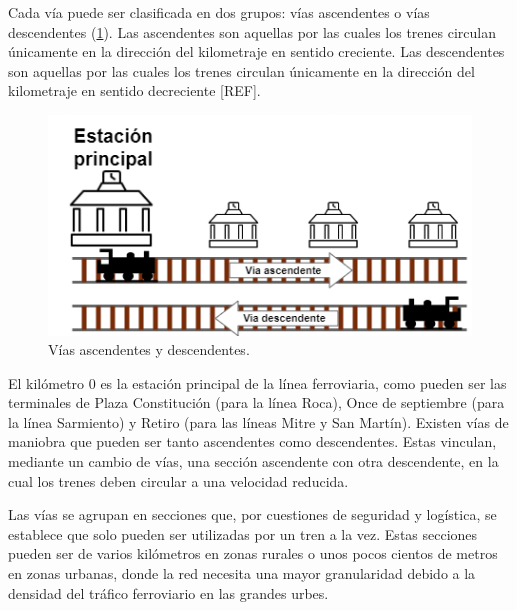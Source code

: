     Cada vía puede ser clasificada en dos grupos: vías ascendentes o vías descendentes (\ref{fig:vias_2}). Las ascendentes son aquellas por las cuales los trenes circulan únicamente en la dirección del kilometraje en sentido creciente. Las descendentes son aquellas por las cuales los trenes circulan únicamente en la dirección del kilometraje en sentido decreciente [REF]. 

    \begin{figure}[!h]
        \centering
        \includegraphics[width=1\textwidth]{Figuras/ascDesc.png}
        \centering\caption{Vías ascendentes y descendentes.}
        \label{fig:vias_2}
    \end{figure}

    El kilómetro 0 es la estación principal de la línea ferroviaria, como pueden ser las terminales de Plaza Constitución (para la línea Roca), Once de septiembre (para la línea Sarmiento) y Retiro (para las líneas Mitre y San Martín).  Existen vías de maniobra que pueden ser tanto ascendentes como descendentes. Estas vinculan, mediante un cambio de vías, una sección ascendente con otra descendente, en la cual los trenes deben circular a una velocidad reducida. 

    Las vías se agrupan en secciones que, por cuestiones de seguridad y logística, se establece que solo pueden ser utilizadas por un tren a la vez. Estas secciones pueden ser de varios kilómetros en zonas rurales o unos pocos cientos de metros en zonas urbanas, donde la red necesita una mayor granularidad debido a la densidad del tráfico ferroviario en las grandes urbes.


    
